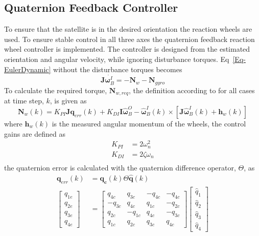 \subsection{Quaternion Feedback Controller}
\label{section: Quaternion Feedback Controller}
To ensure that the satellite is in the desired orientation the reaction wheels are used. To ensure stable control in all three axes \cite{wie1989quarternion} the quaternion feedback reaction wheel controller is implemented. The controller is designed from the estimated orientation and angular velocity, while ignoring disturbance torques. Eq~\ref{Eq-EulerDynamic} without the disturbance torques becomes
\begin{equation}
\mathbf{J}\dot{\boldsymbol{\omega}_B^I} = -\mathbf{N}_w - \mathbf{N}_{gyro}
\end{equation}
To calculate the required torque, $\mathbf{N}_{w,req}$, the definition according to \cite{steyn2008attitude} for all cases at time step, $k$, is given as
\begin{equation}
	\mathbf{N}_w(k) = K_{PI}\mathbf{Jq}_{err}(k) + K_{DI}\mathbf{I}\hat{\boldsymbol{\omega}}_B^O - \hat{\boldsymbol{\omega}}_B^I(k) \times [\mathbf{J}\hat{\boldsymbol{\omega}}_B^I(k) + \mathbf{h}_{w}(k)]
\end{equation}
where $\mathbf{h}_{w}(k)$ is the measured angular momentum of the wheels, the control gains are defined as
\begin{equation}
	\begin{aligned}
		K_{PI} &= 2 \omega_n^2\\
		K_{DI} &= 2 \zeta \omega_n \\
	\end{aligned}
	\label{eq:controlGain}
\end{equation}
the quaternion error is calculated with the quaternion difference operator, $\Theta$, as
\begin{equation}
	\begin{aligned}
		\mathbf{q}_{err}(k) &= \mathbf{q_c}(k) \Theta \hat{\mathbf{q}}(k) \\
		\begin{bmatrix} 
			q_{1e} \\
			q_{2e} \\
			q_{3e} \\
			q_{4e}
		\end{bmatrix} &= \begin{bmatrix} 
			q_{4c} & q_{3c} & -q_{4c} & -q_{4c} \\
			-q_{3c} & q_{4c} & q_{1c} & -q_{2c} \\
			q_{2c} & - q_{1c} & q_{4c} & -q_{3c} \\
			q_{1c} & q_{2c} & q_{3c} & q_{4c}
		\end{bmatrix}
		\begin{bmatrix} 
			\hat{q}_1 \\
			\hat{q}_2 \\
			\hat{q}_3 \\
			\hat{q}_4
		\end{bmatrix}
	\end{aligned}
	\label{eq:quaternionError}
\end{equation}
